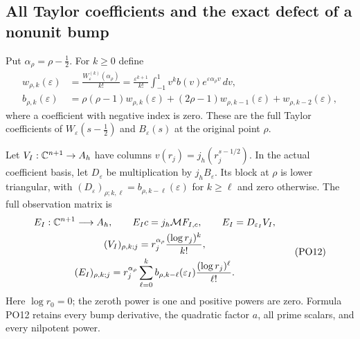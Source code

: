 \subsection{All Taylor coefficients and the exact defect of a nonunit bump}

Put \(\alpha_\rho=\rho-\tfrac12\). For \(k\ge0\) define
\[
 \begin{aligned}
 w_{\rho,k}(\varepsilon)
   &=\frac{W_\varepsilon^{(k)}(\alpha_\rho)}{k!}
     =\frac{\varepsilon^{k+1}}{k!}
        \int_{-1}^1v^k b(v)e^{\varepsilon\alpha_\rho v}\,dv,\\
 b_{\rho,k}(\varepsilon)
   &=\rho(\rho-1)w_{\rho,k}(\varepsilon)
       +(2\rho-1)w_{\rho,k-1}(\varepsilon)+w_{\rho,k-2}(\varepsilon),
 \end{aligned}
 \tag{PO11}\label{PO:po:taylor}
\]
where a coefficient with negative index is zero. These are the
full Taylor coefficients of \(W_\varepsilon(s-\tfrac12)\) and
\(B_\varepsilon(s)\) at the original point \(\rho\).

Let \(V_I:\mathbb C^{n+1}\to A_h\) have columns
\(v(r_j)=j_h(r_j^{s-1/2})\). In the actual coefficient basis,
let \(D_\varepsilon\) be multiplication by \(j_hB_\varepsilon\).
Its block at \(\rho\) is lower triangular, with
\((D_\varepsilon)_{\rho;k,\ell}=b_{\rho,k-\ell}(\varepsilon)\) for \(k\ge\ell\)
and zero otherwise. The full observation matrix is
\[
 \begin{gathered}
 E_I:\mathbb C^{n+1}\longrightarrow A_h,\qquad
 E_Ic=j_h\mathcal M F_{I,c},\qquad E_I=D_{\varepsilon_I}V_I,\\
 (V_I)_{\rho,k;j}
       =r_j^{\alpha_\rho}\frac{(\log r_j)^k}{k!},\\
 (E_I)_{\rho,k;j}
       =r_j^{\alpha_\rho}\sum_{\ell=0}^k
           b_{\rho,k-\ell}(\varepsilon_I)\frac{(\log r_j)^\ell}{\ell!}.
 \end{gathered}
 \tag{PO12}\label{PO:po:matrix}
\]
Here \(\log r_0=0\); the zeroth power is one and positive powers
are zero. Formula PO12 retains every bump derivative, the quadratic
factor \(a\), all prime scalars, and every nilpotent power.

